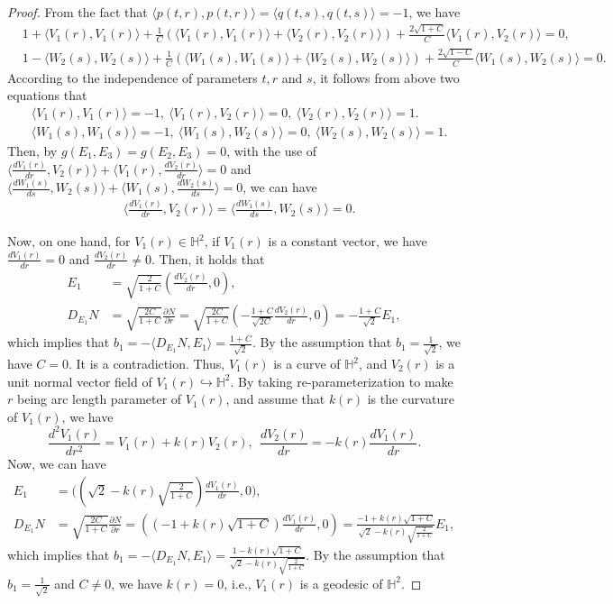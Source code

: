 \documentclass[10pt,a4paper]{amsart}
\begin{document}
\begin{proof}
From the fact that $\langle p(t,r),p(t,r)\rangle=\langle q(t,s),q(t,s)\rangle=-1$, we have
$$
\begin{aligned}
&1+\langle V_1(r),V_1(r)\rangle+\tfrac{1}{C}(\langle V_1(r),V_1(r)\rangle+\langle V_2(r),V_2(r)\rangle)
+\tfrac{2\sqrt{1+C}}{C}\langle V_1(r),V_2(r)\rangle=0,\\
&1-\langle W_2(s),W_2(s)\rangle+\tfrac{1}{C}(\langle W_1(s),W_1(s)\rangle+\langle W_2(s),W_2(s)\rangle)
+\tfrac{2\sqrt{1-C}}{C}\langle W_1(s),W_2(s)\rangle=0.
\end{aligned}
$$
According to the independence of parameters $t,r$ and $s$, it follows from above two equations that
$$
\begin{aligned}
&\langle V_1(r),V_1(r)\rangle=-1,\ \langle V_1(r),V_2(r)\rangle=0,\ \langle V_2(r),V_2(r)\rangle=1.\\
&\langle W_1(s),W_1(s)\rangle=-1,\ \langle W_1(s),W_2(s)\rangle=0,\ \langle W_2(s),W_2(s)\rangle=1.
\end{aligned}
$$
Then, by $g(E_1,E_3)=g(E_2,E_3)=0$,
with the use of $\langle \frac{dV_1(r)}{dr},V_2(r)\rangle+\langle V_1(r),\frac{dV_2(r)}{dr}\rangle=0$
and $\langle \frac{dW_1(s)}{ds},W_2(s)\rangle+\langle W_1(s),\frac{dW_2(s)}{ds}\rangle=0$,
we can have
$$
\begin{aligned}
&\langle \frac{d V_1(r)}{dr},V_2(r)\rangle=\langle \frac{d W_1(s)}{ds},W_2(s)\rangle=0.
\end{aligned}
$$

Now, on one hand, for $V_1(r)\in \mathbb{H}^2$, if $V_1(r)$ is a constant vector, we have
$\frac{d V_1(r)}{dr}=0$ and $\frac{d V_2(r)}{dr}\neq0$. Then, it holds that
$$
\begin{aligned}
E_1&=\sqrt{\tfrac{2}{1+C}}(\tfrac{d V_2(r)}{d r},0),\\
D_{E_1}N&=\sqrt{\tfrac{2C}{1+C}}\tfrac{\partial N}{\partial r}=
\sqrt{\tfrac{2C}{1+C}}(-\tfrac{1+C}{\sqrt{2C}}\tfrac{d V_2(r)}{d r},0)=-\tfrac{1+C}{\sqrt{2}}E_1,
\end{aligned}
$$
which implies that $b_1=-\langle D_{E_1}N,E_1\rangle=\frac{1+C}{\sqrt{2}}$.
By the assumption that $b_1=\frac{1}{\sqrt{2}}$, we have $C=0$. It is a contradiction.
Thus, $V_1(r)$ is a curve of $\mathbb{H}^2$,
and $V_2(r)$ is a unit normal vector field of $V_1(r)\hookrightarrow\mathbb{H}^2$.
By taking re-parameterization to make $r$ being arc length parameter of $V_1(r)$, and assume that
$k(r)$ is the curvature of $V_1(r)$, we have
$$
\frac{d^2V_1(r)}{dr^2}=V_1(r)+k(r)V_2(r), \ \
\frac{dV_2(r)}{dr}=-k(r)\frac{dV_1(r)}{dr}.
$$
Now, we can have
$$
\begin{aligned}
E_1&=\Big((\sqrt{2}-k(r)\sqrt{\tfrac{2}{1+C}})\tfrac{d V_1(r)}{dr},0\Big),\\
D_{E_1}N&=\sqrt{\tfrac{2C}{1+C}}\tfrac{\partial N}{\partial r}=
((-1+k(r)\sqrt{1+C})\tfrac{d V_1(r)}{d r},0)=\tfrac{-1+k(r)\sqrt{1+C}}{\sqrt{2}-k(r)\sqrt{\tfrac{2}{1+C}}}E_1,
\end{aligned}
$$
which implies that $b_1=-\langle D_{E_1}N,E_1\rangle=\frac{1-k(r)\sqrt{1+C}}{\sqrt{2}-k(r)\sqrt{\frac{2}{1+C}}}$.
By the assumption that $b_1=\frac{1}{\sqrt{2}}$ and $C\neq0$, we have $k(r)=0$,
i.e., $V_1(r)$ is a geodesic of $\mathbb{H}^2$.


\end{proof}
\end{document}
